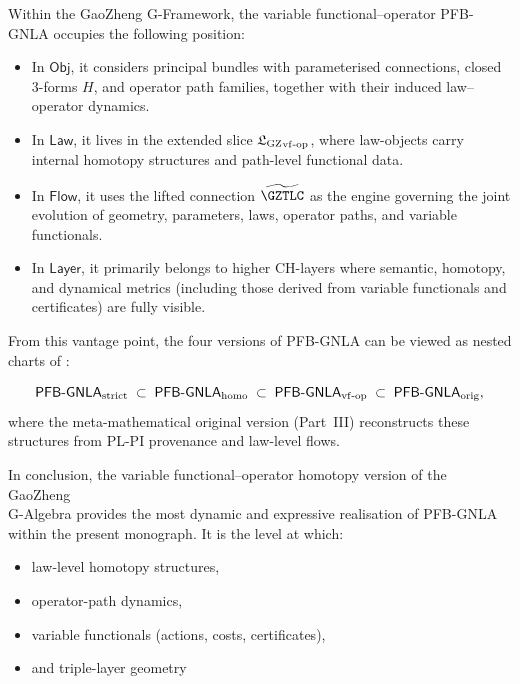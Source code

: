 \documentclass[11pt]{book}
\theoremstyle{plain}
\theoremstyle{definition}
\newcommand{\GZLS}{\ensuremath{\mathfrak{L}_{\mathrm{GZ}}}}       \newcommand{\GZLT}{\ensuremath{M_{!w}}}                           \newcommand{\GZLOC}{\ensuremath{A_M}}                             \newcommand{\GZLCurv}{\ensuremath{\mathcal{F}_{\mathrm{law}}}}
\begin{document}
Within the GaoZheng G-Framework, the variable functional--operator
PFB-GNLA occupies the following position:

\begin{itemize}
  \item In $\mathsf{Obj}$, it considers principal bundles with
        parameterised connections, closed 3-forms $H$, and operator
        path families, together with their induced law–operator
        dynamics.
  \item In $\mathsf{Law}$, it lives in the extended slice
        ${\GZLS}_{\mathrm{vf\text- op}}$, where law-objects carry
        internal homotopy structures and path-level functional data.
  \item In $\mathsf{Flow}$, it uses the lifted connection
        $\widetilde{\GZTLC}$ as the engine governing the joint
        evolution of geometry, parameters, laws, operator paths, and
        variable functionals.
  \item In $\mathsf{Layer}$, it primarily belongs to higher CH-layers
        where semantic, homotopy, and dynamical metrics (including
        those derived from variable functionals and certificates) are
        fully visible.
\end{itemize}

From this vantage point, the four versions of PFB-GNLA can be viewed
as nested charts of \GZGMS:

\[
   \mathsf{PFB\text- GNLA}_{\mathrm{strict}}
   \;\subset\;
   \mathsf{PFB\text- GNLA}_{\mathrm{homo}}
   \;\subset\;
   \mathsf{PFB\text- GNLA}_{\mathrm{vf\text- op}}
   \;\subset\;
   \mathsf{PFB\text- GNLA}_{\mathrm{orig}},
\]
where the meta-mathematical original version (Part~III) reconstructs
these structures from PL-PI provenance and law-level flows.



\medskip

In conclusion, the variable functional--operator homotopy version of
the GaoZheng \\
G-Algebra provides the most dynamic and expressive
realisation of PFB-GNLA within the present monograph. It is the level
at which:

\begin{itemize}
  \item law-level homotopy structures,
  \item operator-path dynamics,
  \item variable functionals (actions, costs, certificates),
  \item and triple-layer geometry
\end{itemize}
\end{document}
